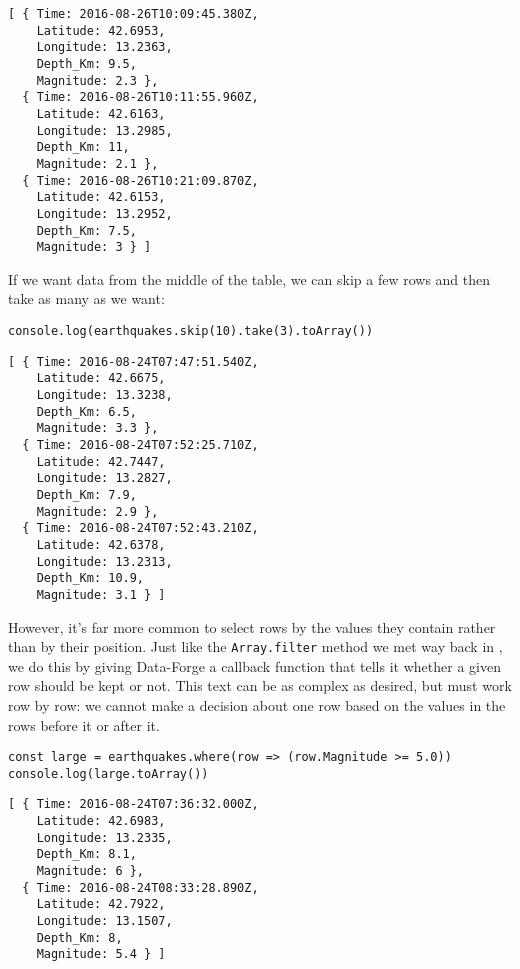 \begin{verbatim}
[ { Time: 2016-08-26T10:09:45.380Z,
    Latitude: 42.6953,
    Longitude: 13.2363,
    Depth_Km: 9.5,
    Magnitude: 2.3 },
  { Time: 2016-08-26T10:11:55.960Z,
    Latitude: 42.6163,
    Longitude: 13.2985,
    Depth_Km: 11,
    Magnitude: 2.1 },
  { Time: 2016-08-26T10:21:09.870Z,
    Latitude: 42.6153,
    Longitude: 13.2952,
    Depth_Km: 7.5,
    Magnitude: 3 } ]
\end{verbatim}

If we want data from the middle of the table,
we can skip a few rows and then take as many as we want:

\begin{verbatim}
console.log(earthquakes.skip(10).take(3).toArray())
\end{verbatim}

\begin{verbatim}
[ { Time: 2016-08-24T07:47:51.540Z,
    Latitude: 42.6675,
    Longitude: 13.3238,
    Depth_Km: 6.5,
    Magnitude: 3.3 },
  { Time: 2016-08-24T07:52:25.710Z,
    Latitude: 42.7447,
    Longitude: 13.2827,
    Depth_Km: 7.9,
    Magnitude: 2.9 },
  { Time: 2016-08-24T07:52:43.210Z,
    Latitude: 42.6378,
    Longitude: 13.2313,
    Depth_Km: 10.9,
    Magnitude: 3.1 } ]
\end{verbatim}


However,
it's far more common to select rows by the values they contain rather than by their position.
Just like the \texttt{Array.filter} method we met way back in ,
we do this by giving Data-Forge a callback function that tells it whether a given row should be kept or not.
This text can be as complex as desired,
but must work row by row:
we cannot make a decision about one row based on the values in the rows before it or after it.

\begin{verbatim}
const large = earthquakes.where(row => (row.Magnitude >= 5.0))
console.log(large.toArray())
\end{verbatim}

\begin{verbatim}
[ { Time: 2016-08-24T07:36:32.000Z,
    Latitude: 42.6983,
    Longitude: 13.2335,
    Depth_Km: 8.1,
    Magnitude: 6 },
  { Time: 2016-08-24T08:33:28.890Z,
    Latitude: 42.7922,
    Longitude: 13.1507,
    Depth_Km: 8,
    Magnitude: 5.4 } ]
\end{verbatim}
    
